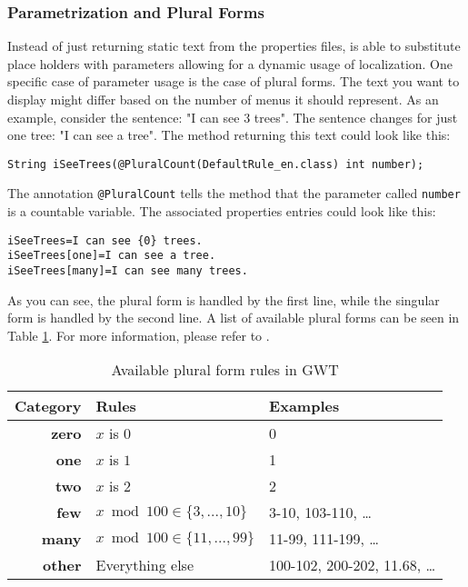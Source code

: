\subsubsection{Parametrization and Plural Forms}
Instead of just returning static text from the properties files, {\germinate} is able to substitute place holders with parameters allowing for a dynamic usage of localization. One specific case of parameter usage is the case of plural forms. The text you want to display might differ based on the number of menus it should represent. As an example, consider the sentence: "I can see 3 trees". The sentence changes for just one tree: "I can see a tree". The method returning this text could look like this:

\begin{lstlisting}[style=Java]
String iSeeTrees(@PluralCount(DefaultRule_en.class) int number);
\end{lstlisting}
\noindent
The annotation \texttt{@PluralCount} tells the method that the parameter called \texttt{number} is a countable variable.
The associated properties entries could look like this:
\begin{lstlisting}[style=Properties]
iSeeTrees=I can see {0} trees.
iSeeTrees[one]=I can see a tree.
iSeeTrees[many]=I can see many trees.
\end{lstlisting}
As you can see, the plural form is handled by the first line, while the singular form is handled by the second line. A list of available plural forms can be seen in Table \ref{tab:examples_plural_form}. For more information, please refer to \cite{GWTPluralForms}.

\begin{table}
    \centering
    \caption{Available plural form rules in GWT}
    \label{tab:examples_plural_form}
    \begin{tabular}{rll}
	    \toprule
	    \textbf{Category} & \textbf{Rules} & \textbf{Examples}\\
	    \midrule
	    \textbf{zero} & $x$ is $0$ & 0\\
	    \textbf{one} & $x$ is $1$ & 1\\
	    \textbf{two} & $x$ is $2$ & 2\\
	    \textbf{few} & $x \bmod 100 \in \{3,...,10\}$ & 3-10, 103-110, \dots\\
	    \textbf{many} & $x \bmod 100 \in \{11,...,99\}$ & 11-99, 111-199, \dots\\
	    \textbf{other} & Everything else & 100-102, 200-202, 11.68, \dots\\
	    \bottomrule
    \end{tabular}
\end{table}

